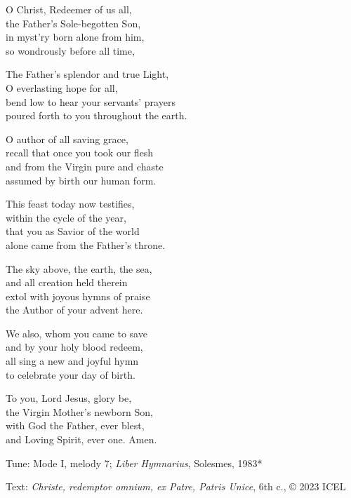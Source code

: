 \hymn

\settowidth{\versewidth}{poured forth to you throughout the earth.}

\begin{hymnverse}%
O Christ, Redeemer of us all,\\
the Father’s Sole-begotten Son,\\
in myst’ry born alone from him,\\
so wondrously before all time,

The Father’s splendor and true Light,\\
O everlasting hope for all,\\
bend low to hear your servants’ prayers\\
poured forth to you throughout the earth.

O author of all saving grace,\\
recall that once you took our flesh\\
and from the Virgin pure and chaste\\
assumed by birth our human form.

This feast today now testifies,\\
within the cycle of the year,\\
that you as Savior of the world\\
alone came from the Father’s throne.

The sky above, the earth, the sea,\\
and all creation held therein\\
extol with joyous hymns of praise\\
the Author of your advent here.

We also, whom you came to save\\
and by your holy blood redeem,\\
all sing a new and joyful hymn\\
to celebrate your day of birth.

To you, Lord Jesus, glory be,\\
the Virgin Mother’s newborn Son,\\
with God the Father, ever blest,\\
and Loving Spirit, ever one. Amen.
\end{hymnverse}

\begin{hymnsource}
Tune: Mode I, melody 7; \emph{Liber Hymnarius}, Solesmes, 1983*

Text: \emph{Christe, redemptor omnium, ex Patre, Patris Unice}, 6th c., © 2023 ICEL

\end{hymnsource}